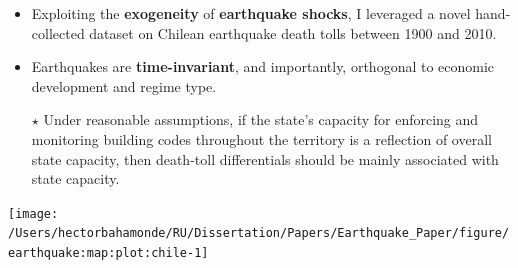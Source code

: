 \documentclass[landscape,a0paper,fontscale=0.292]{baposter}
\begin{document}
\begin{poster}
{\begin{minipage}{.4\linewidth}
	\begin{itemize}
		\item Exploiting the {\bf exogeneity} of {\bf earthquake shocks}, I leveraged a novel hand-collected dataset on Chilean earthquake death tolls between 1900 and 2010.
		\item Earthquakes are {\bf time-invariant}, and importantly, orthogonal to economic development and regime type.
		\item[{\LARGE{\bf{\color{red}$\star$}}}] Under reasonable assumptions, if the state's capacity for enforcing and monitoring building codes throughout the territory is a reflection of overall state capacity, then death-toll differentials should be mainly associated with state capacity.
	\end{itemize}
	 
\end{minipage}
  \begin{minipage}{.7\linewidth}
    \centering
    \texttt{[image: /Users/hectorbahamonde/RU/Dissertation/Papers/Earthquake\_Paper/figure/earthquake:map:plot:chile-1]}
\end{minipage}


}





\end{poster}
\end{document}

